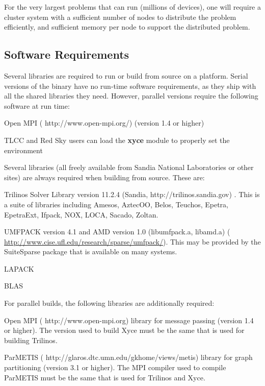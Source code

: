 \documentclass[11pt,report,strict]{SANDreport}
\begin{document}
For the very largest problems that \Xyce{} can run (millions of
devices), one will require a cluster system with a sufficient number
of nodes to distribute the problem efficiently, and sufficient memory
per node to support the distributed problem.  

\subsection{Software Requirements}
Several libraries are required to run \Xyce{} or build \Xyce{} from
source on a platform.  Serial versions of the \Xyce{} binary have no
run-time software requirements, as they ship with all the shared
libraries they need.  However, parallel versions require the following
software at run time:
\begin{XyceItemize}
\item Open MPI ({\color{XyceDeepRed} http://www.open-mpi.org/}) (version 1.4 or higher)    
\item TLCC and Red Sky users can load the {\bf xyce} module to properly set the environment 
\end{XyceItemize}

Several libraries (all freely available from Sandia National
Laboratories or other sites) are always required when building \Xyce{}
from source.  These are:
\begin{XyceItemize}
\item Trilinos Solver Library version 11.2.4 (Sandia, 
{\color{XyceDeepRed} http://trilinos.sandia.gov}) .  This is a suite
of libraries including Amesos, AztecOO, Belos, Teuchos, Epetra, EpetraExt, Ifpack, NOX, LOCA, Sacado, Zoltan.
\item UMFPACK version 4.1 and AMD version 1.0 (libumfpack.a, libamd.a)
  ({\color{XyceDeepRed}
  \url{http://www.cise.ufl.edu/research/sparse/umfpack/}}).  This may be provided by the SuiteSparse package that is available on many systems.
\item LAPACK 
\item BLAS
\end{XyceItemize}
For parallel builds, the following libraries are additionally required:
\begin{XyceItemize}
\item Open MPI ({\color{XyceDeepRed} http://www.open-mpi.org}) library
  for message passing (version 1.4 or higher).  The version used to
  build Xyce must be the same that is used for building Trilinos.
\item ParMETIS ({\color{XyceDeepRed}
  http://glaros.dtc.umn.edu/gkhome/views/metis}) library for graph
  partitioning (version 3.1 or higher).  The MPI compiler used to
  compile ParMETIS must be the same that is used for Trilinos and
  Xyce.
\end{XyceItemize}
\end{document}
